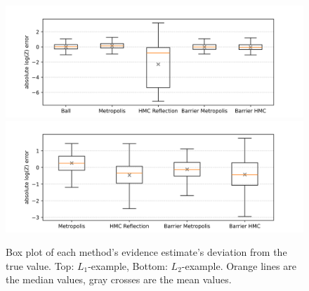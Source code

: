 \documentclass[12pt, a4paper]{report}
\begin{document}
\begin{figure}
    \centering
    \includegraphics[scale=0.4]{figs/results/logZ_diffs_spike_20d.png}
    \includegraphics[scale=0.4]{figs/results/logZ_diffs_spike_offcenter_20d.png}
    \caption{Box plot of each method's evidence estimate's deviation from the true value. Top: $L_1$-example, Bottom: $L_2$-example. Orange lines are the median values, gray crosses are the mean values.}
    \label{fig:results_logZ_diffs}
\end{figure}
\end{document}
